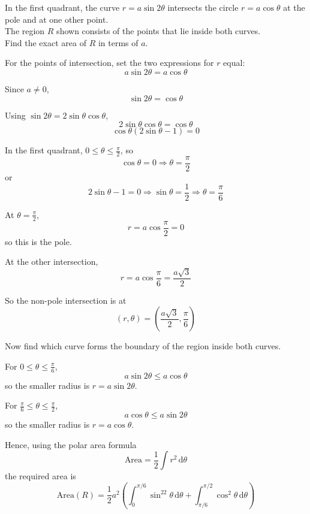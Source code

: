 \documentclass[leqno]{article}
\begin{document}
\begin{enumerate}[
	  label=\textbf{\arabic*.},
	  leftmargin=*,
	  topsep=0pt,
	  partopsep=0pt,
	  parsep=0pt
	]
	
	In the first quadrant, the curve $r=a\sin 2\theta$ intersects the circle $r=a\cos\theta$ at the pole and at one other point. \\
	
	The region $R$ shown consists of the points that lie inside both curves. \\
	
	Find the exact area of $R$ in terms of $a$.  \\
	
	\vspace*{30pt}
	
	\begin{tcolorbox}[colback=white, colframe=scarlet, title={\textbf{Solution}}, breakable, grow to left by=6mm, grow to right by=10mm]
	For the points of intersection, set the two expressions for \(r\) equal:
	\[
	a\sin 2\theta=a\cos\theta
	\]
	
	Since \(a\neq 0\),
	\[
	\sin 2\theta=\cos\theta
	\]
	
	Using \(\sin 2\theta=2\sin\theta\cos\theta\),
	\[
	2\sin\theta\cos\theta=\cos\theta
	\]
	\[
	\cos\theta(2\sin\theta-1)=0
	\]
	
	In the first quadrant, \(0\le \theta\le \frac{\pi}{2}\), so
	\[
	\cos\theta=0 \Rightarrow \theta=\frac{\pi}{2}
	\]
	or
	\[
	2\sin\theta-1=0 \Rightarrow \sin\theta=\frac12 \Rightarrow \theta=\frac{\pi}{6}
	\]
	
	At \(\theta=\frac{\pi}{2}\),
	\[
	r=a\cos\frac{\pi}{2}=0
	\]
	so this is the pole.
	
	At the other intersection,
	\[
	r=a\cos\frac{\pi}{6}=\frac{a\sqrt3}{2}
	\]
	
	So the non-pole intersection is at
	\[
	\left(r,\theta\right)=\left(\frac{a\sqrt3}{2},\frac{\pi}{6}\right)
	\]
	
	Now find which curve forms the boundary of the region inside both curves.
	
	For \(0\le \theta\le \frac{\pi}{6}\),
	\[
	a\sin2\theta \le a\cos\theta
	\]
	so the smaller radius is \(r=a\sin2\theta\).
	
	For \(\frac{\pi}{6}\le \theta\le \frac{\pi}{2}\),
	\[
	a\cos\theta \le a\sin2\theta
	\]
	so the smaller radius is \(r=a\cos\theta\).
	
	Hence, using the polar area formula
	\[
	\text{Area}=\frac12\int r^2\,\mathrm{d}\theta
	\]
	the required area is
	\[
	\text{Area}(R)=\frac12a^2\left(\int_0^{\pi/6}\sin^22\theta\,\mathrm{d}\theta+\int_{\pi/6}^{\pi/2}\cos^2\theta\,\mathrm{d}\theta\right)
	\]
	

\end{tcolorbox}
\end{enumerate}
\end{document}
